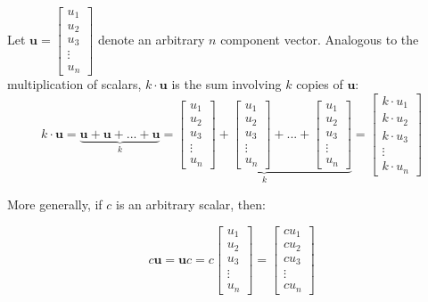 \documentclass{article}
\begin{document}
Let \(\mathbf{u} = \begin{bmatrix} u_1 \\ u_2 \\ u_3 \\ \vdots \\ u_n \end{bmatrix}\) denote an arbitrary \(n\) component vector. Analogous to the multiplication of scalars, \(k \cdot \mathbf{u}\) is the sum involving \(k\) copies of \(\mathbf{u}\):
\[k \cdot \mathbf{u} = \underbrace{\mathbf{u} + \mathbf{u} + ... + \mathbf{u}}_k = \underbrace{\begin{bmatrix} u_1 \\ u_2 \\ u_3 \\ \vdots \\ u_n \end{bmatrix} + \begin{bmatrix} u_1 \\ u_2 \\ u_3 \\ \vdots \\ u_n \end{bmatrix} + ... + \begin{bmatrix} u_1 \\ u_2 \\ u_3 \\ \vdots \\ u_n \end{bmatrix}}_k = \begin{bmatrix} k \cdot u_1 \\ k \cdot u_2 \\ k \cdot u_3 \\ \vdots \\ k \cdot u_n \end{bmatrix}\]

More generally, if \(c\) is an arbitrary scalar, then:

\[c\mathbf{u} = \mathbf{u} c = c\begin{bmatrix} u_1 \\ u_2 \\ u_3 \\ \vdots \\ u_n \end{bmatrix} = \begin{bmatrix} c u_1  \\ c u_2 \\ c u_3 \\ \vdots \\ c u_n \end{bmatrix}\]
\end{document}
